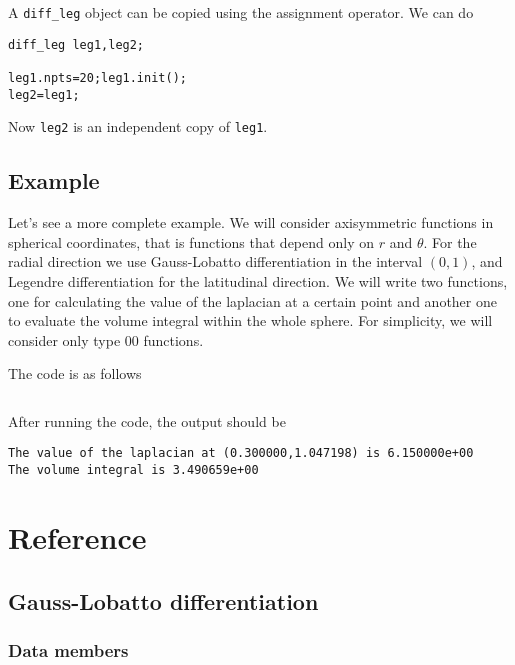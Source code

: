 A {\tt diff\_leg} object can be copied using the assignment operator. We can do
\begin{verbatim}
diff_leg leg1,leg2;

leg1.npts=20;leg1.init();
leg2=leg1; 
\end{verbatim}
Now {\tt leg2} is an independent copy of {\tt leg1}.
\subsection{Example}
\label{sec:example_diff_leg}

Let's see a more complete example. We will consider axisymmetric functions in spherical coordinates, 
that is functions that depend only on $r$ and $\theta$. For the radial direction we use
Gauss-Lobatto differentiation in the interval $(0,1)$, and Legendre differentiation for the
latitudinal direction. We will write two functions, one for calculating the value of the laplacian
at a certain point and another one to evaluate the volume integral within the whole sphere.
For simplicity, we will consider only type 00 functions.

The code is as follows

\inputminted[frame=single]{cpp}{../code_examples/numdiff/example2.cpp}

After running the code, the output should be

\begin{verbatim}
The value of the laplacian at (0.300000,1.047198) is 6.150000e+00
The volume integral is 3.490659e+00
\end{verbatim}

\section{Reference}

\renewcommand{\funclistcolumns}{3}

\subsection{Gauss-Lobatto differentiation}
\subsubsection{Data members}


